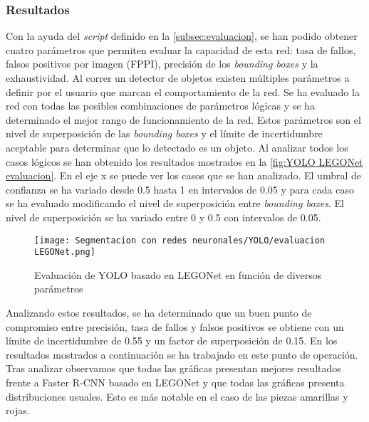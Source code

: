 \subsubsection*{Resultados}
Con la ayuda del \textit{script} definido en la \autoref{subsec:evaluacion}, se han podido obtener cuatro parámetros que permiten evaluar la capacidad de esta red: tasa de fallos, falsos positivos por imagen (FPPI), precisión de los \textit{bounding boxes} y la exhaustividad. Al correr un detector de objetos existen múltiples parámetros a definir por el usuario que marcan el comportamiento de la red. Se ha evaluado la red con todas las posibles combinaciones de parámetros lógicas y se ha determinado el mejor rango de funcionamiento de la red. Estos parámetros son el nivel de superposición de las \textit{bounding boxes} y el límite de incertidumbre aceptable para determinar que lo detectado es un objeto. Al analizar todos los casos lógicos se han obtenido los resultados mostrados en la \autoref{fig:YOLO LEGONet evaluacion}. En el eje x se puede ver los casos que se han analizado. El umbral de confianza se ha variado desde 0.5 hasta 1 en intervalos de 0.05 y para cada caso se ha evaluado modificando el nivel de superposición entre \textit{bounding boxes}. El nivel de superposición se ha variado entre 0 y 0.5 con intervalos de 0.05.

\begin{figure}[ht]  %
	\centering
	\texttt{[image: Segmentacion con redes neuronales/YOLO/evaluacion LEGONet.png]}
	\caption{Evaluación de YOLO basado en LEGONet en función de diversos parámetros}
	\label{fig:YOLO LEGONet evaluacion}
\end{figure}

Analizando estos resultados, se ha determinado que un buen punto de compromiso entre precisión, tasa de fallos y falsos positivos se obtiene con un límite de incertidumbre de 0.55 y un factor de superposición de 0.15. En los resultados mostrados a continuación se ha trabajado en este punto de operación. Tras analizar observamos que todas las gráficas presentan mejores resultados frente a Faster R-CNN basado en LEGONet y que todas las gráficas presenta distribuciones usuales. Esto es más notable en el caso de las piezas amarillas y rojas.

